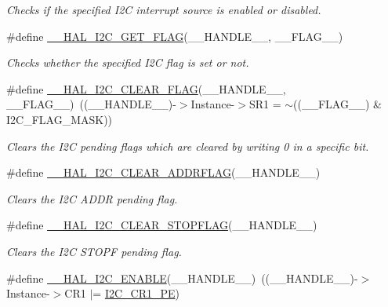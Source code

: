 \begin{DoxyCompactItemize}
\begin{DoxyCompactList}\small\item\em Checks if the specified I2C interrupt source is enabled or disabled. \end{DoxyCompactList}\item 
\#define \mbox{\hyperlink{group___i2_c___exported___macros_gafbdf01a7dc3183de7af56456cab93551}{\+\_\+\+\_\+\+H\+A\+L\+\_\+\+I2\+C\+\_\+\+G\+E\+T\+\_\+\+F\+L\+AG}}(\+\_\+\+\_\+\+H\+A\+N\+D\+L\+E\+\_\+\+\_\+,  \+\_\+\+\_\+\+F\+L\+A\+G\+\_\+\+\_\+)
\begin{DoxyCompactList}\small\item\em Checks whether the specified I2C flag is set or not. \end{DoxyCompactList}\item 
\#define \mbox{\hyperlink{group___i2_c___exported___macros_ga933e2ea67e86db857a06b70a93be1186}{\+\_\+\+\_\+\+H\+A\+L\+\_\+\+I2\+C\+\_\+\+C\+L\+E\+A\+R\+\_\+\+F\+L\+AG}}(\+\_\+\+\_\+\+H\+A\+N\+D\+L\+E\+\_\+\+\_\+,  \+\_\+\+\_\+\+F\+L\+A\+G\+\_\+\+\_\+)~((\+\_\+\+\_\+\+H\+A\+N\+D\+L\+E\+\_\+\+\_\+)-\/$>$Instance-\/$>$S\+R1 = $\sim$((\+\_\+\+\_\+\+F\+L\+A\+G\+\_\+\+\_\+) \& I2\+C\+\_\+\+F\+L\+A\+G\+\_\+\+M\+A\+SK))
\begin{DoxyCompactList}\small\item\em Clears the I2C pending flags which are cleared by writing 0 in a specific bit. \end{DoxyCompactList}\item 
\#define \mbox{\hyperlink{group___i2_c___exported___macros_ga15a0a1a04971d44f9a1b82cab10af24f}{\+\_\+\+\_\+\+H\+A\+L\+\_\+\+I2\+C\+\_\+\+C\+L\+E\+A\+R\+\_\+\+A\+D\+D\+R\+F\+L\+AG}}(\+\_\+\+\_\+\+H\+A\+N\+D\+L\+E\+\_\+\+\_\+)
\begin{DoxyCompactList}\small\item\em Clears the I2C A\+D\+DR pending flag. \end{DoxyCompactList}\item 
\#define \mbox{\hyperlink{group___i2_c___exported___macros_gae8e94c16809df16411862b11fea781db}{\+\_\+\+\_\+\+H\+A\+L\+\_\+\+I2\+C\+\_\+\+C\+L\+E\+A\+R\+\_\+\+S\+T\+O\+P\+F\+L\+AG}}(\+\_\+\+\_\+\+H\+A\+N\+D\+L\+E\+\_\+\+\_\+)
\begin{DoxyCompactList}\small\item\em Clears the I2C S\+T\+O\+PF pending flag. \end{DoxyCompactList}\item 
\#define \mbox{\hyperlink{group___i2_c___exported___macros_gacff412c47b0c1d63ef3b2a07f65988b7}{\+\_\+\+\_\+\+H\+A\+L\+\_\+\+I2\+C\+\_\+\+E\+N\+A\+B\+LE}}(\+\_\+\+\_\+\+H\+A\+N\+D\+L\+E\+\_\+\+\_\+)~((\+\_\+\+\_\+\+H\+A\+N\+D\+L\+E\+\_\+\+\_\+)-\/$>$Instance-\/$>$C\+R1 $\vert$=  \mbox{\hyperlink{group___peripheral___registers___bits___definition_ga953b0d38414808db79da116842ed3262}{I2\+C\+\_\+\+C\+R1\+\_\+\+PE}})

\end{DoxyCompactItemize}
